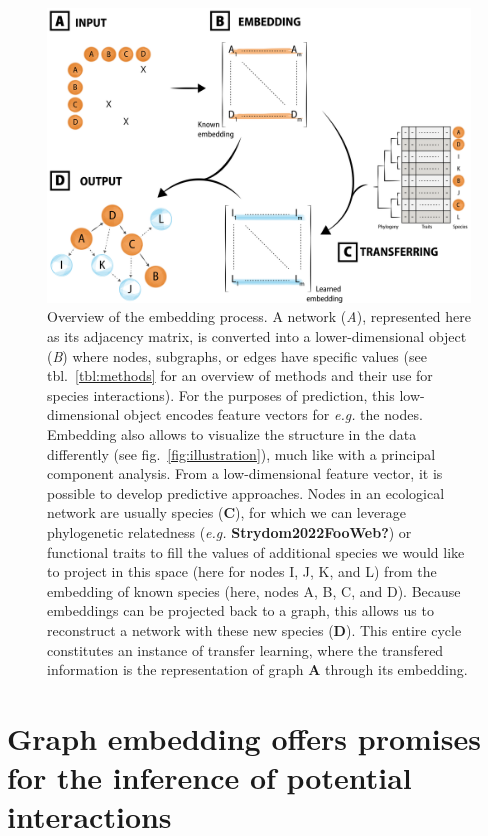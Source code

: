 \documentclass[10pt,oneside]{article}
\makeatletter
\def\maxwidth{\ifdim\Gin@nat@width>\linewidth\linewidth
\else\Gin@nat@width\fi}
\let\Oldincludegraphics\includegraphics
\renewcommand{\includegraphics}[1]{\Oldincludegraphics[width=\maxwidth]{#1}}
\makeatother
\begin{document}
\begin{figure}
\hypertarget{fig:embedding}{%
\centering
\includegraphics{figures/conceptual_2.png}
\caption{Overview of the embedding process. A network (\emph{A}),
represented here as its adjacency matrix, is converted into a
lower-dimensional object (\emph{B}) where nodes, subgraphs, or edges
have specific values (see tbl.~\ref{tbl:methods} for an overview of
methods and their use for species interactions). For the purposes of
prediction, this low-dimensional object encodes feature vectors for
\emph{e.g.} the nodes. Embedding also allows to visualize the structure
in the data differently (see fig.~\ref{fig:illustration}), much like
with a principal component analysis. From a low-dimensional feature
vector, it is possible to develop predictive approaches. Nodes in an
ecological network are usually species (\textbf{C}), for which we can
leverage phylogenetic relatedness (\emph{e.g.}
\textbf{Strydom2022FooWeb?}) or functional traits to fill the values of
additional species we would like to project in this space (here for
nodes I, J, K, and L) from the embedding of known species (here, nodes
A, B, C, and D). Because embeddings can be projected back to a graph,
this allows us to reconstruct a network with these new species
(\textbf{D}). This entire cycle constitutes an instance of transfer
learning, where the transfered information is the representation of
graph \textbf{A} through its embedding.}\label{fig:embedding}
}
\end{figure}

\hypertarget{graph-embedding-offers-promises-for-the-inference-of-potential-interactions}{%
\section{Graph embedding offers promises for the inference of potential
interactions}\label{graph-embedding-offers-promises-for-the-inference-of-potential-interactions}}
\end{document}
